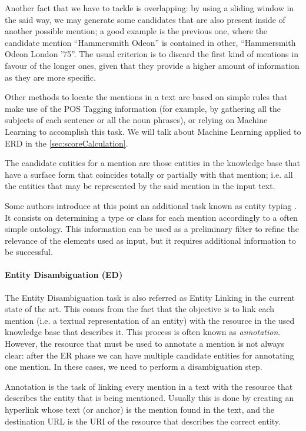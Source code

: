 Another fact that we have to tackle is overlapping: by using a sliding window in the said way, we may generate some candidates that are also present inside of another possible mention; a good example is the previous one, where the candidate mention ``Hammersmith Odeon'' is contained in other, ``Hammersmith Odeon London '75''. The usual criterion is to discard the first kind of mentions in favour of the longer ones, given that they provide a higher amount of information as they are more specific.

Other methods to locate the mentions in a text are based on simple rules that make use of the POS Tagging information (for example, by gathering all the subjects of each sentence or all the noun phrases), or relying on Machine Learning to accomplish this task. We will talk about Machine Learning applied to ERD in the \autoref{sec:scoreCalculation}.

\begin{defi}
	The candidate entities for a mention are those entities in the knowledge base that have a surface form that coincides totally or partially with that mention; i.e. all the entities that may be represented by the said mention in the input text.
\end{defi}

Some authors introduce at this point an additional task known as entity typing \cite{plu2015hybrid}. It consists on determining a type or class for each mention accordingly to a often simple ontology. This information can be used as a preliminary filter to refine the relevance of the elements used as input, but it requires additional information to be successful.

\paragraph{Entity Disambiguation (ED)}  

The Entity Disambiguation task is also referred as Entity Linking in the current state of the art. This comes from the fact that the objective is to link each mention (i.e. a textual representation of an entity) with the resource in the used knowledge base that describes it. This process is often known as \emph{annotation}. However, the resource that must be used to annotate a mention is not always clear: after the ER phase we can have multiple candidate entities for annotating one mention. In these cases, we need to perform a disambiguation step.

\begin{defi}[{\bf Annotation.}]
	Annotation is the task of linking every mention in a text with the resource that describes the entity that is being mentioned. Usually this is done by creating an hyperlink whose text (or anchor) is the mention found in the text, and the destination URL is the URI of the resource that describes the correct entity.
\end{defi}

